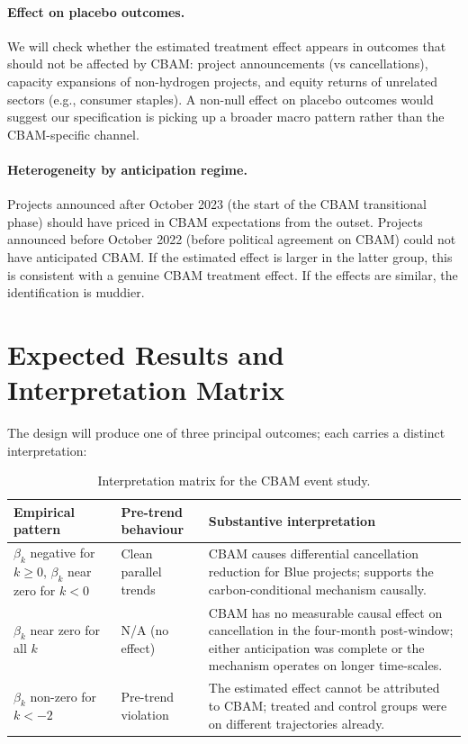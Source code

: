\documentclass[11pt,a4paper]{article}
\begin{document}
\paragraph{Effect on placebo outcomes.} We will check whether the estimated treatment effect appears in outcomes that should not be affected by CBAM: project announcements (vs cancellations), capacity expansions of non-hydrogen projects, and equity returns of unrelated sectors (e.g., consumer staples). A non-null effect on placebo outcomes would suggest our specification is picking up a broader macro pattern rather than the CBAM-specific channel.

\paragraph{Heterogeneity by anticipation regime.} Projects announced after October 2023 (the start of the CBAM transitional phase) should have priced in CBAM expectations from the outset. Projects announced before October 2022 (before political agreement on CBAM) could not have anticipated CBAM. If the estimated effect is larger in the latter group, this is consistent with a genuine CBAM treatment effect. If the effects are similar, the identification is muddier.

\section{Expected Results and Interpretation Matrix}
\label{sec:ch8-expected}

The design will produce one of three principal outcomes; each carries a distinct interpretation:

\begin{table}[h!]
\centering
\caption{Interpretation matrix for the CBAM event study.}
\begin{tabular}{p{4cm}p{4cm}p{6cm}}
\toprule
Empirical pattern & Pre-trend behaviour & Substantive interpretation \\
\midrule
$\beta_k$ negative for $k \geq 0$, $\beta_k$ near zero for $k < 0$ & Clean parallel trends & CBAM causes differential cancellation reduction for Blue projects; supports the carbon-conditional mechanism causally. \\
\midrule
$\beta_k$ near zero for all $k$ & N/A (no effect) & CBAM has no measurable causal effect on cancellation in the four-month post-window; either anticipation was complete or the mechanism operates on longer time-scales. \\
\midrule
$\beta_k$ non-zero for $k < -2$ & Pre-trend violation & The estimated effect cannot be attributed to CBAM; treated and control groups were on different trajectories already. \\
\bottomrule
\end{tabular}
\label{tab:ch8-interpretation}
\end{table}
\end{document}

